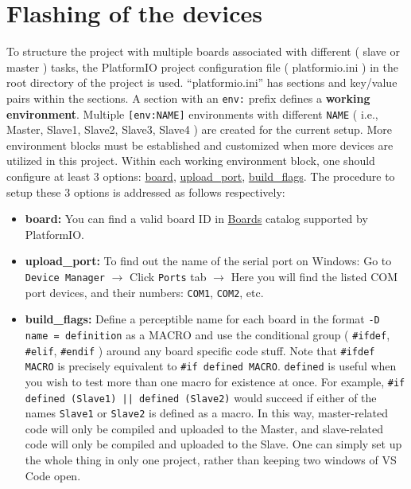 \documentclass[11pt,a4paper]{article}
\begin{document}
\newpage


\section{Flashing of the devices}

To structure the project with multiple boards associated with different ( slave or master ) tasks, the PlatformIO project configuration file ( platformio.ini ) in the root directory of the project is used. ``platformio.ini'' has sections and key/value pairs within the sections. A section with an \texttt{env:} prefix defines a \textbf{working environment}. Multiple \texttt{[env:NAME]} environments with different \texttt{NAME} ( i.e., Master, Slave1, Slave2, Slave3, Slave4 ) are created for the current setup. More environment blocks must be established and customized when more devices are utilized in this project. Within each working environment block, one should configure at least 3 options: \href{https://docs.platformio.org/en/latest/projectconf/section_env_platform.html#board}{board}, \href{https://docs.platformio.org/en/latest/projectconf/section_env_upload.html#upload-port}{upload\_port}, \href{https://docs.platformio.org/en/latest/projectconf/section_env_build.html#build-flags}{build\_flags}. The procedure to setup these 3 options is addressed as follows respectively:

\begin{itemize}

\item \textbf{board:} You can find a valid board ID in \href{https://docs.platformio.org/en/latest/boards/index.html#boards}{Boards} catalog supported by PlatformIO. 

\item \textbf{upload\_port:} To find out the name of the serial port on Windows: Go to \texttt{Device Manager} $\rightarrow$ Click \texttt{Ports} tab $\rightarrow$ Here you will find the listed COM port devices, and their numbers: \texttt{COM1}, \texttt{COM2}, etc.

\item \textbf{build\_flags:} Define a perceptible name for each board in the format \texttt{-D name = definition} as a MACRO and use the conditional group ( \texttt{\#ifdef}, \texttt{\#elif}, \texttt{\#endif} ) around any board specific code stuff.
Note that \texttt{\#ifdef MACRO} is precisely equivalent to \texttt{\#if defined MACRO}. \texttt{defined} is useful when you wish to test more than one macro for existence at once. For example,
\texttt{\#if defined (Slave1) || defined (Slave2)}
would succeed if either of the names \texttt{Slave1} or \texttt{Slave2} is defined as a macro. In this way, master-related code will only be compiled and uploaded to the Master, and slave-related code will only be compiled and uploaded to the Slave. One can simply set up the whole thing in only one project, rather than keeping two windows of VS Code open.

\end{itemize} 
\end{document}

